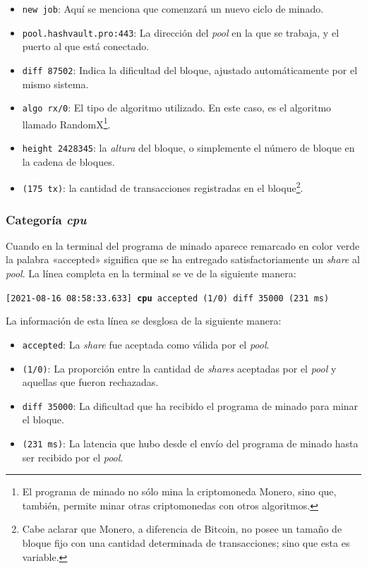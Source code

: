 \documentclass[12pt,a4paper,twoside]{book}
\begin{document}
\begin{itemize}
\item \texttt{new job}: Aquí se menciona que comenzará un nuevo ciclo de minado.
\item \texttt{pool.hashvault.pro:443}: La dirección del \textit{pool} en la que se trabaja, y el puerto al que está conectado.
\item \texttt{diff 87502}: Indica la dificultad del bloque, ajustado automáticamente por el mismo sistema.
\item \texttt{algo rx/0}: El tipo de algoritmo utilizado. En este caso, es el algoritmo llamado RandomX\footnote{El programa de minado no sólo mina la criptomoneda Monero, sino que, también, permite minar otras criptomonedas con otros algoritmos.}.
\item \texttt{height 2428345}: la \textit{altura} del bloque, o simplemente el número de bloque en la cadena de bloques.
\item \texttt{(175 tx)}: la cantidad de transacciones registradas en el bloque\footnote{Cabe aclarar que Monero, a diferencia de Bitcoin, no posee un tamaño de bloque fijo con una cantidad determinada de transacciones; sino que esta es variable.}.
\end{itemize}

\subsubsection{Categoría \textit{cpu}}
Cuando en la terminal del programa de minado aparece remarcado en color verde la palabra «accepted» significa que se ha entregado satisfactoriamente un \textit{share} al \textit{pool}. La línea completa en la terminal se ve de la siguiente manera:

{\footnotesize \texttt{[2021-08-16 08:58:33.633] \textbf{cpu} accepted (1/0) diff 35000 (231 ms)}}

La información de esta línea se desglosa de la siguiente manera:

\begin{itemize}
\item \texttt{accepted}: La \textit{share} fue aceptada como válida por el \textit{pool}.
\item \texttt{(1/0)}: La proporción entre la cantidad de \textit{shares} aceptadas por el \textit{pool} y aquellas que fueron rechazadas.
\item \texttt{diff 35000}: La dificultad que ha recibido el programa de minado para minar el bloque.
\item \texttt{(231 ms)}: La latencia que hubo desde el envío del programa de minado hasta ser recibido por el \textit{pool}.
\end{itemize}
\end{document}
